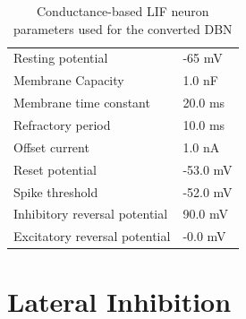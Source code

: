 \begin{table}[h!]
\caption{Conductance-based LIF neuron parameters used for the converted DBN}
\centering
\label{cobalifparam}
\begin{tabular}{|ll|}
\hline
Resting potential    			& -65 mV 		    \\
Membrane Capacity    			& 1.0 nF 		     \\
Membrane time constant    		& 20.0 ms		             \\
Refractory period     			& 10.0 ms		                 \\
Offset current    				& 1.0 nA		              \\
Reset potential     			& -53.0 mV 	               \\
Spike threshold     			& -52.0 mV          \\
Inhibitory reversal potential  & 90.0 mV	              \\
Excitatory reversal potential  & -0.0 mV 	               \\\hline
\end{tabular}
\end{table}
   
\pagebreak   
   
\section{Lateral Inhibition}   
   
